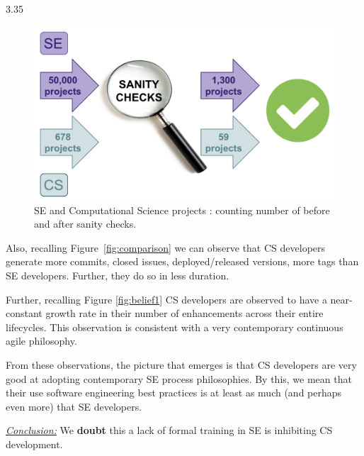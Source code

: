 \documentclass[sigconf,review,anonymous]{acmart}
\newenvironment{RQ}{\vspace{1mm}\begin{tcolorbox}[enhanced,width=3.4in,size=fbox,colback=red!5!white,drop shadow southeast,sharp corners]}{\end{tcolorbox}}
\begin{document}
\centerline{  3.35 }

\begin{figure}
  \centering
  \includegraphics[width=\linewidth]{img/sanity.png} 
  \caption{ SE and Computational Science  projects : counting number of before and after sanity checks.}
  \label{fig:sanity}
\end{figure}
Also, recalling Figure~\ref{fig:comparison}
we can observe that CS developers generate more
commits, closed issues, deployed/released versions, more tags
than SE developers. Further, they do so in less duration.

Further, recalling Figure \ref{fig:belief1} CS developers are observed to have a near-constant growth rate in their number of enhancements across their entire lifecycles. This observation is consistent with a very contemporary continuous agile philosophy. 

From these observations, the picture that emerges is that CS developers are very good at adopting contemporary  SE process philosophies. By this, we
mean that their
use software engineering best practices is at least as much (and perhaps even more) that SE developers. 


\begin{RQ}
\textit{\underline{Conclusion:}} We \textbf{doubt} this a lack of formal training in SE is inhibiting CS development. 
\end{RQ}

\end{document}
